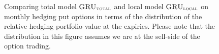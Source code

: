 \documentclass[letterpaper,12pt,titlepage,oneside,final]{book}
\numberwithin{equation}{section}
\theoremstyle{definition}
\newcommand{\modelT}{\textsc{GRU}_{\textsc{total}}}
\newcommand{\modelL}{\textsc{GRU}_{\textsc{local}}}
\begin{document}
\begin{figure}[htp!]
	\centering
	\caption{Comparing total model $\modelT$ and local model $\modelL$ on monthly hedging put options in terms of the distribution of the  relative hedging portfolio value at the expiries. Please note that the distribution in this figure assumes we are at the sell-side of the option trading.} \label{fig:putTotalM1}
	\centering

\end{figure}
\end{document}
